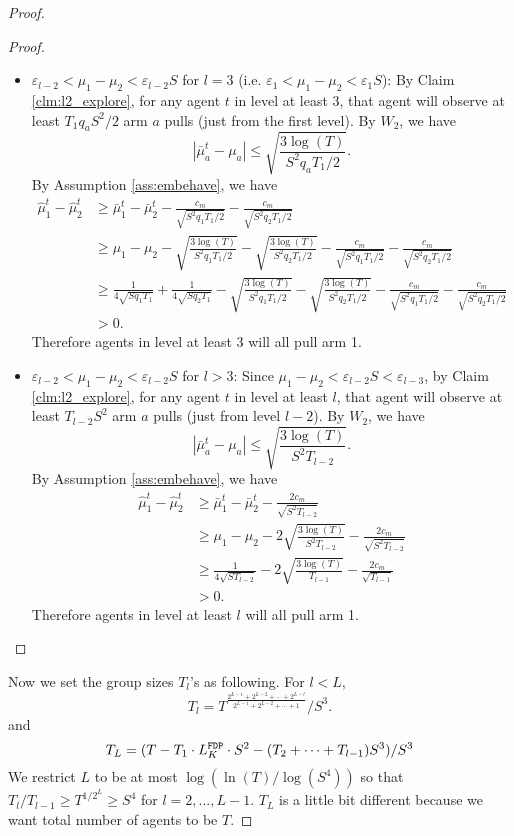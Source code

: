 \begin{proof}
\begin{proof}
\begin{itemize}
\item $\varepsilon_{l-2} < \mu_1 - \mu_2 < \varepsilon_{l-2}S$ for $l =3$ (i.e. $\varepsilon_1 < \mu_1 - \mu_2 < \varepsilon_1S$): By Claim \ref{clm:l2_explore}, for any agent $t$ in level at least $3$, that agent will observe at least $T_1q_aS^2/2$ arm $a$ pulls (just from the first level). By $W_2$, we have
\[
|\bar{\mu}_a^t - \mu_a| \leq \sqrt{\frac{3\log(T)}{S^2q_aT_1/2}}.
\]
By Assumption \ref{ass:embehave}, we have
\begin{align*}
\hat{\mu}_1^t - \hat{\mu}_2^t &\geq \bar{\mu}_1^t - \bar{\mu}_2^t - \frac{c_m}{\sqrt{S^2q_1T_1/2}}-\frac{c_m}{\sqrt{S^2q_2T_1/2}}  \\
&\geq \mu_1 -\mu_2 -  \sqrt{\frac{3\log(T)}{S^2q_1T_1/2}}- \sqrt{\frac{3\log(T)}{S^2q_2T_1/2}}- \frac{c_m}{\sqrt{S^2q_1T_1/2}}-\frac{c_m}{\sqrt{S^2q_2T_1/2}}  \\
&\geq\frac{1}{4\sqrt{Sq_1T_1}} + \frac{1}{4\sqrt{Sq_2T_1}}  -  \sqrt{\frac{3\log(T)}{S^2q_1T_1/2}}- \sqrt{\frac{3\log(T)}{S^2q_2T_1/2}}- \frac{c_m}{\sqrt{S^2q_1T_1/2}}-\frac{c_m}{\sqrt{S^2q_2T_1/2}}  \\
&>0.
\end{align*}
Therefore agents in level at least 3 will all pull arm 1. 

\item $\varepsilon_{l-2} < \mu_1 - \mu_2 < \varepsilon_{l-2}S$ for $l >3$: Since $\mu_1-\mu_2 < \varepsilon_{l-2}S < \varepsilon_{l-3}$, by Claim \ref{clm:l2_explore}, for any agent $t$ in level at least $l$, that agent will observe at least $T_{l-2}S^2$ arm $a$ pulls (just from level $l-2$). By $W_2$, we have
\[
|\bar{\mu}_a^t - \mu_a| \leq \sqrt{\frac{3\log(T)}{S^2T_{l-2}}}.
\]
By Assumption \ref{ass:embehave}, we have
\begin{align*}
\hat{\mu}_1^t - \hat{\mu}_2^t &\geq \bar{\mu}_1^t - \bar{\mu}_2^t - \frac{2c_m}{\sqrt{S^2T_{l-2}}} \\
&\geq \mu_1 -\mu_2 - 2 \sqrt{\frac{3\log(T)}{S^2T_{l-2}}}- \frac{2c_m}{\sqrt{S^2T_{l-2}}} \\
&\geq\frac{1}{4\sqrt{ST_{l-2}}} -  2 \sqrt{\frac{3\log(T)}{T_{l-1}}}- \frac{2c_m}{\sqrt{T_{l-1}}} \\
&>0.
\end{align*}
Therefore agents in level at least $l$ will all pull arm 1. 
\end{itemize}
\end{proof}

Now we set the group sizes $T_l$'s as following. For $l < L$,
\[
T_l = T^{\frac{2^{L-1} + 2^{L-2} + \cdots + 2^{L-l}}{2^{L-1}+ 2^{L-2} + \cdots + 1}}/S^3.
\]
and 
\[
T_L = (T - T_1 \cdot L^\mathtt{FDP}_K\cdot S^2 - (T_2 + \cdots + T_{l-1}) S^3) /S^3
\]
We restrict $L$ to be at most $\log(\ln(T)/\log(S^4))$ so that $T_l / T_{l-1} \geq T^{1/2^L} \geq S^4$ for $l = 2,...,L-1$. $T_L$ is a little bit different because we want total number of agents to be $T$. 


\end{proof}
